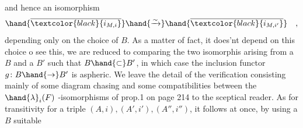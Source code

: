 and hence an isomorphism
\[ \hand{\overline{\textcolor{black}{i_{M,i}}}} \hand{\xrightarrow{\sim}} \hand{\overline{\textcolor{black}{i_{M,i'}}}} \quad , \]
depending only on the choice of $B$. As a matter of fact, it does'nt
depend on this choice \hand{\unsure{$\leftarrow$}} o see this, we are reduced to comparing
the two isomorphis arising from a $B$ and a $B'$ such that $B \hand{\subset} B'$, in 
which case the inclusion functor $g\colon B \hand{\to} B'$ is aspheric. We leave the
detail of the verification\deleted{,} \hand{(}consisting mainly of some diagram chasing
and some compatibilities between the $\hand{\lambda}_i(F)$ -isomorphisms of prop.1 on
page 214\hand{)} to the sceptical reader. As for transitivity for a triple
$(A,i),(A',i'),(A'',i'')$, it  follows at once, by using a $B$ suitable  

